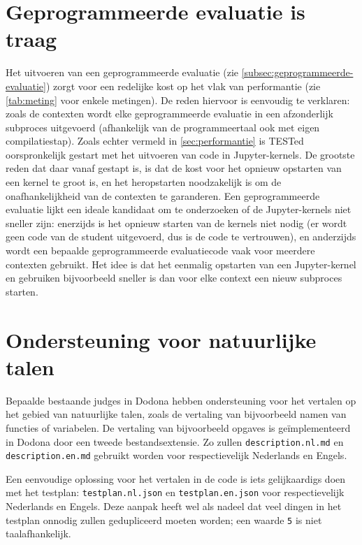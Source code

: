\section{Geprogrammeerde evaluatie is traag}\label{sec:geprogrammeerde-evaluatie-is-traag}

Het uitvoeren van een geprogrammeerde evaluatie (zie \cref{subsec:geprogrammeerde-evaluatie}) zorgt voor een redelijke kost op het vlak van performantie (zie \cref{tab:meting} voor enkele metingen).
De reden hiervoor is eenvoudig te verklaren: zoals de contexten wordt elke geprogrammeerde evaluatie in een afzonderlijk subproces uitgevoerd (afhankelijk van de programmeertaal ook met eigen compilatiestap).
Zoals echter vermeld in \cref{sec:performantie} is TESTed oorspronkelijk gestart met het uitvoeren van code in Jupyter-kernels.
De grootste reden dat daar vanaf gestapt is, is dat de kost voor het opnieuw opstarten van een kernel te groot is, en het heropstarten noodzakelijk is om de onafhankelijkheid van de contexten te garanderen.
Een geprogrammeerde evaluatie lijkt een ideale kandidaat om te onderzoeken of de Jupyter-kernels niet sneller zijn: enerzijds is het opnieuw starten van de kernels niet nodig (er wordt geen code van de student uitgevoerd, dus is de code te vertrouwen), en anderzijds wordt een bepaalde geprogrammeerde evaluatiecode vaak voor meerdere contexten gebruikt.
Het idee is dat het eenmalig opstarten van een Jupyter-kernel en gebruiken bijvoorbeeld sneller is dan voor elke context een nieuw subproces starten.

\section{Ondersteuning voor natuurlijke talen}\label{sec:ondersteuning-voor-natuurlijke-talen}

Bepaalde bestaande judges in Dodona hebben ondersteuning voor het vertalen op het gebied van natuurlijke talen, zoals de vertaling van bijvoorbeeld namen van functies of variabelen.
De vertaling van bijvoorbeeld opgaves is geïmplementeerd in Dodona door een tweede bestandsextensie.
Zo zullen \texttt{description.nl.md} en \texttt{description.en.md} gebruikt worden voor respectievelijk Nederlands en Engels.

Een eenvoudige oplossing voor het vertalen in de code is iets gelijkaardigs doen met het testplan: \texttt{testplan.nl.json} en \texttt{testplan.en.json} voor respectievelijk Nederlands en Engels.
Deze aanpak heeft wel als nadeel dat veel dingen in het testplan onnodig zullen gedupliceerd moeten worden;
een waarde \texttt{5} is niet taalafhankelijk.

